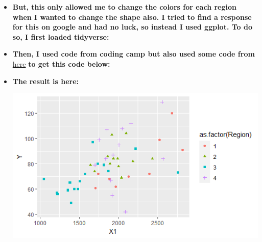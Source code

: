 \documentclass[12pt,letterpaper]{article}
\begin{document}
\begin{itemize}
 \begin{itemize}
 	\item \textbf{But, this only allowed me to change the colors for each region when I wanted to change the shape also. I tried to find a response for this on google and had no luck, so instead I used ggplot. To do so, I first loaded tidyverse:}
 	
 		
 	\item \textbf{Then, I used code from coding camp but also used some code from} \href{https://sscc.wisc.edu/sscc/pubs/dvr/three-variables.html}{here} \textbf{to get this code below:}
 	
 		
 		
 	\item \textbf{The result is here:}
 	
 	\includegraphics[width=.8\textwidth]{ggplot_reg_x1_y}\hfill
 	
 \end{itemize}


\end{itemize}
\end{document}
